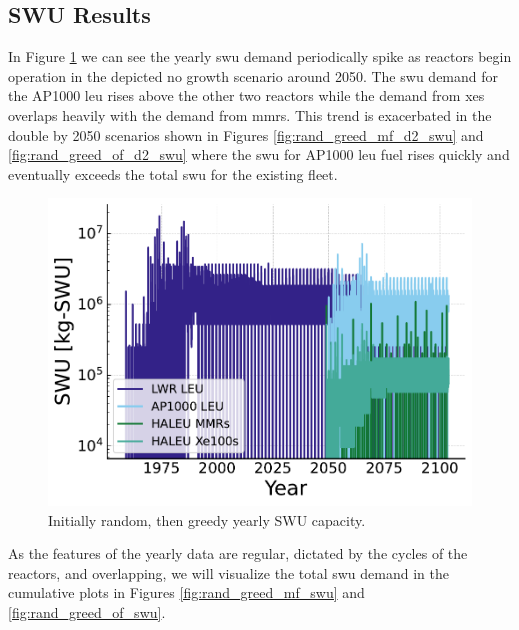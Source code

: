 \subsection{SWU Results}
\label{sec:rand_greed_swu}

In Figure \ref{fig:swu_yearly_rand_greed} we can see the yearly \gls{swu} demand periodically spike as reactors begin operation in the depicted no growth scenario around 2050. The \gls{swu} demand for the AP1000 \gls{leu} rises above the other two reactors while the demand from \glspl{xe} overlaps heavily with the demand from \glspl{mmr}. This trend is exacerbated in the double by 2050 scenarios shown in Figures \ref{fig:rand_greed_mf_d2_swu} and \ref{fig:rand_greed_of_d2_swu} where the \gls{swu} for AP1000 \gls{leu} fuel rises quickly and eventually exceeds the total \gls{swu} for the existing fleet.

\begin{figure}[H]
    \centering
    \includegraphics[scale=0.7]{images/results/swu/multi_drgng_swu_by_fuel.pdf}
    \caption{Initially random, then greedy yearly SWU capacity.}
    \label{fig:swu_yearly_rand_greed}
\end{figure}

As the features of the yearly data are regular, dictated by the cycles of the
reactors, and overlapping, we will visualize the total \gls{swu} demand in the
cumulative plots in Figures \ref{fig:rand_greed_mf_swu} and \ref{fig:rand_greed_of_swu}.



